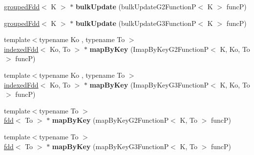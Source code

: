 \begin{DoxyCompactItemize}
\item 
\hypertarget{classfaster_1_1groupedFdd_ac986965bdb4e59de83e64b2cee70fbd6}{}\hyperlink{classfaster_1_1groupedFdd}{grouped\+Fdd}$<$ K $>$ $\ast$ {\bfseries bulk\+Update} (bulk\+Update\+G2\+Function\+P$<$ K $>$ func\+P)\label{classfaster_1_1groupedFdd_ac986965bdb4e59de83e64b2cee70fbd6}

\item 
\hypertarget{classfaster_1_1groupedFdd_a94e31fcb308364979d63dd508a689121}{}\hyperlink{classfaster_1_1groupedFdd}{grouped\+Fdd}$<$ K $>$ $\ast$ {\bfseries bulk\+Update} (bulk\+Update\+G3\+Function\+P$<$ K $>$ func\+P)\label{classfaster_1_1groupedFdd_a94e31fcb308364979d63dd508a689121}

\item 
\hypertarget{classfaster_1_1groupedFdd_a8cb1ae5d826c3d627b2585427d39da71}{}{\footnotesize template$<$typename Ko , typename To $>$ }\\\hyperlink{classfaster_1_1indexedFdd}{indexed\+Fdd}$<$ Ko, To $>$ $\ast$ {\bfseries map\+By\+Key} (Imap\+By\+Key\+G2\+Function\+P$<$ K, Ko, To $>$ func\+P)\label{classfaster_1_1groupedFdd_a8cb1ae5d826c3d627b2585427d39da71}

\item 
\hypertarget{classfaster_1_1groupedFdd_ab1b385fdc95450d7a07418b05ca3c404}{}{\footnotesize template$<$typename Ko , typename To $>$ }\\\hyperlink{classfaster_1_1indexedFdd}{indexed\+Fdd}$<$ Ko, To $>$ $\ast$ {\bfseries map\+By\+Key} (Imap\+By\+Key\+G3\+Function\+P$<$ K, Ko, To $>$ func\+P)\label{classfaster_1_1groupedFdd_ab1b385fdc95450d7a07418b05ca3c404}

\item 
\hypertarget{classfaster_1_1groupedFdd_a8a2e1ce009a5d701d7f27d9821ae0770}{}{\footnotesize template$<$typename To $>$ }\\\hyperlink{classfaster_1_1fdd}{fdd}$<$ To $>$ $\ast$ {\bfseries map\+By\+Key} (map\+By\+Key\+G2\+Function\+P$<$ K, To $>$ func\+P)\label{classfaster_1_1groupedFdd_a8a2e1ce009a5d701d7f27d9821ae0770}

\item 
\hypertarget{classfaster_1_1groupedFdd_a571d54ed407c328526e7c67cd7be991d}{}{\footnotesize template$<$typename To $>$ }\\\hyperlink{classfaster_1_1fdd}{fdd}$<$ To $>$ $\ast$ {\bfseries map\+By\+Key} (map\+By\+Key\+G3\+Function\+P$<$ K, To $>$ func\+P)\label{classfaster_1_1groupedFdd_a571d54ed407c328526e7c67cd7be991d}


\end{DoxyCompactItemize}
